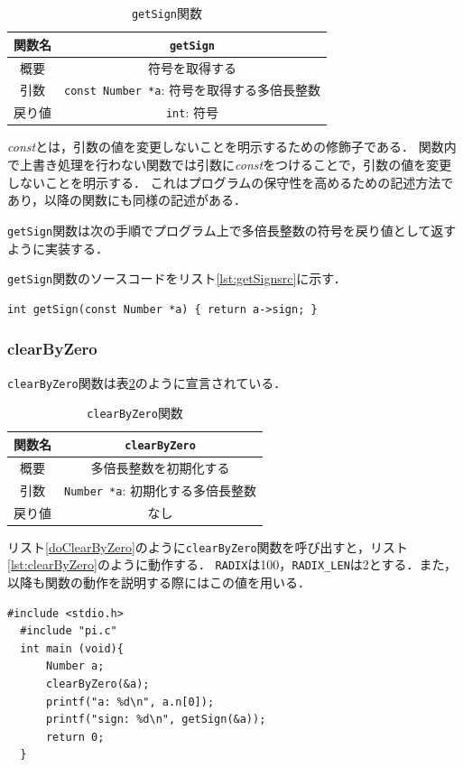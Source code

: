 \documentclass[a4paper,11pt,dvipdfmx]{jsarticle}
\begin{document}
\begin{table}[H]
\centering
\caption{\texttt{getSign}関数}
\label{table:lst:getSign}
\begin{tabular}{c||c}
\hline
関数名    & \texttt{getSign}   \\
\hline
概要    & 符号を取得する   \\
\hline
引数    & \texttt{const Number *a}: 符号を取得する多倍長整数   \\
\hline
戻り値    & \texttt{int}: 符号   \\
\hline
\end{tabular}
\end{table}

\textit{const}とは，引数の値を変更しないことを明示するための修飾子である．
関数内で上書き処理を行わない関数では引数に\textit{const}をつけることで，引数の値を変更しないことを明示する．
これはプログラムの保守性を高めるための記述方法であり，以降の関数にも同様の記述がある．

\texttt{getSign}関数は次の手順でプログラム上で多倍長整数の符号を戻り値として返すように実装する．

\texttt{getSign}関数のソースコードをリスト\ref{lst:getSignsrc}に示す．
\begin{lstlisting}[caption=\texttt{getSign}関数,label=lst:getSignsrc]
  int getSign(const Number *a) { return a->sign; }
\end{lstlisting}



\subsubsection{clearByZero}
\texttt{clearByZero}関数は表\ref{table:lst:clearByZero}のように宣言されている．

\begin{table}[H]
\centering
\caption{\texttt{clearByZero}関数}
\label{table:lst:clearByZero}
\begin{tabular}{c||c}
\hline
関数名    & \texttt{clearByZero}   \\
\hline
概要    & 多倍長整数を初期化する   \\
\hline
引数    & \texttt{Number *a}: 初期化する多倍長整数   \\
\hline
戻り値    & なし   \\
\hline
\end{tabular}
\end{table}

リスト\ref{doClearByZero}のように\texttt{clearByZero}関数を呼び出すと，リスト\ref{lst:clearByZero}のように動作する．
\texttt{RADIX}は100，\texttt{RADIX\_LEN}は2とする．また，以降も関数の動作を説明する際にはこの値を用いる．
\begin{lstlisting}[caption=\texttt{clearByZero}関数の呼び出し,label=doClearByZero]
  #include <stdio.h>
  #include "pi.c"
  int main (void){
      Number a;
      clearByZero(&a);
      printf("a: %d\n", a.n[0]);
      printf("sign: %d\n", getSign(&a));
      return 0;
  }
\end{lstlisting}
\end{document}
